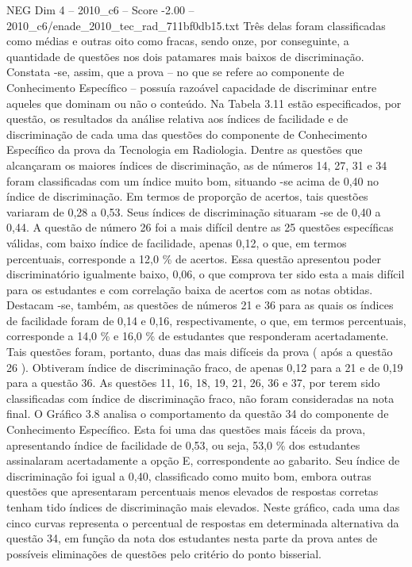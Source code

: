 \begin{textsample}{NEG Dim 4 – 2010\_c6 – Score -2.00 – 2010\_c6/enade\_2010\_tec\_rad\_711bf0db15.txt}
Três delas foram classificadas como médias e outras oito como fracas, sendo onze, por conseguinte, a quantidade de questões nos dois patamares mais baixos de discriminação.
Constata -se, assim, que a prova – no que se refere ao componente de Conhecimento Específico – possuía razoável capacidade de discriminar entre aqueles que dominam ou não o conteúdo.
Na Tabela 3.11 estão especificados, por questão, os resultados da análise relativa aos índices de facilidade e de discriminação de cada uma das questões do componente de Conhecimento Específico da prova da Tecnologia em Radiologia.
Dentre as questões que alcançaram os maiores índices de discriminação, as de números 14, 27, 31 e 34 foram classificadas com um índice muito bom, situando -se acima de 0,40 no índice de discriminação.
Em termos de proporção de acertos, tais questões variaram de 0,28 a 0,53.
Seus índices de discriminação situaram -se de 0,40 a 0,44.
A questão de número 26 foi a mais difícil dentre as 25 questões específicas válidas, com baixo índice de facilidade, apenas 0,12, o que, em termos percentuais, corresponde a 12,0 \% de acertos.
Essa questão apresentou poder discriminatório igualmente baixo, 0,06, o que comprova ter sido esta a mais difícil para os estudantes e com correlação baixa de acertos com as notas obtidas.
Destacam -se, também, as questões de números 21 e 36 para as quais os índices de facilidade foram de 0,14 e 0,16, respectivamente, o que, em termos percentuais, corresponde a 14,0 \% e 16,0 \% de estudantes que responderam acertadamente.
Tais questões foram, portanto, duas das mais difíceis da prova ( após a questão 26 ).
Obtiveram índice de discriminação fraco, de apenas 0,12 para a 21 e de 0,19 para a questão 36.
As questões 11, 16, 18, 19, 21, 26, 36 e 37, por terem sido classificadas com índice de discriminação fraco, não foram consideradas na nota final.
O Gráfico 3.8 analisa o comportamento da questão 34 do componente de Conhecimento Específico.
Esta foi uma das questões mais fáceis da prova, apresentando índice de facilidade de 0,53, ou seja, 53,0 \% dos estudantes assinalaram acertadamente a opção E, correspondente ao gabarito.
Seu índice de discriminação foi igual a 0,40, classificado como muito bom, embora outras questões que apresentaram percentuais menos elevados de respostas corretas tenham tido índices de discriminação mais elevados.
Neste gráfico, cada uma das cinco curvas representa o percentual de respostas em determinada alternativa da questão 34, em função da nota dos estudantes nesta parte da prova antes de possíveis eliminações de questões pelo critério do ponto bisserial.

\end{textsample}
